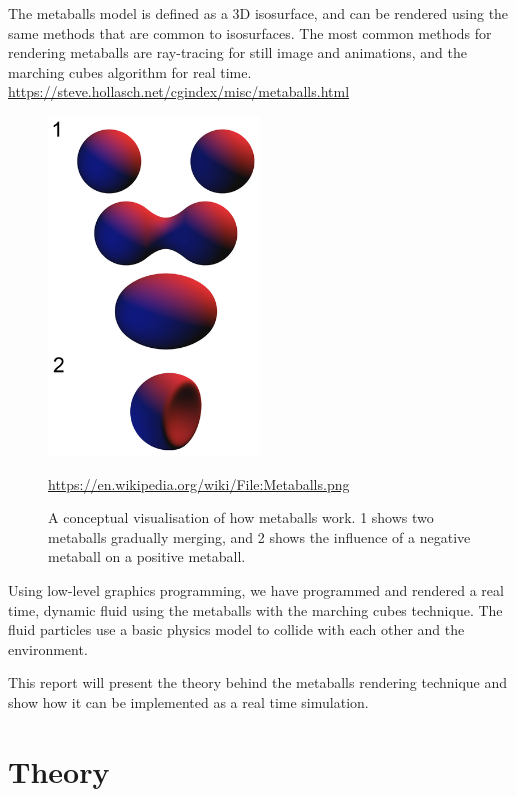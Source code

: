 \documentclass{article}
\begin{document}
\begin{multicols}{2}
    The metaballs model is defined as a 3D isosurface, and can be rendered using the same methods that are common to isosurfaces.
    The most common methods for rendering metaballs are ray-tracing for still image and animations, and the marching cubes algorithm for real time. \href{https://steve.hollasch.net/cgindex/misc/metaballs.html}{https://steve.hollasch.net/cgindex/misc/metaballs.html}    
    \begin{figure}[H]
    	\centering
    	\begin{minipage}[b]{0.4\textwidth}
    		\centering
	        \includegraphics[width=0.5\textwidth]{img/metaballs-concept.png}
    	    \caption{A conceptual visualisation of how metaballs work. 1 shows two metaballs gradually merging, and 2 shows the influence of a negative metaball on a positive metaball.} \href{https://en.wikipedia.org/wiki/File:Metaballs.png}{https://en.wikipedia.org/wiki/File:Metaballs.png}
	        \label{fig:metaballs-concept}
		\end{minipage}
    \end{figure}

	Using low-level graphics programming, we have programmed and rendered a real time, dynamic fluid using the metaballs with the marching cubes technique. The fluid particles use a basic physics model to collide with each other and the environment.
	
    This report will present the theory behind the metaballs rendering technique and show how it can be implemented as a real time simulation.

    \section{Theory}


\end{multicols}
\end{document}
